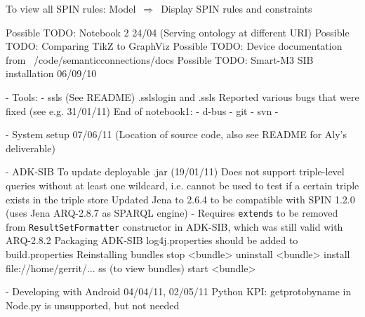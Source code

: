 To view all SPIN rules:
Model~$\Rightarrow$~Display SPIN rules and constraints



Possible TODO: Notebook 2 24/04 (Serving ontology at different URI)
Possible TODO: Comparing TikZ to GraphViz
Possible TODO: Device documentation from ~/code/semanticconnections/docs
Possible TODO: Smart-M3 SIB installation 06/09/10



- Tools: 
	- ssls (See README)
		.sslslogin and .ssls
		Reported various bugs that were fixed (see e.g. 31/01/11)
	End of notebook1:
	- d-bus
	- git
	- svn
	-

- System setup
	07/06/11 (Location of source code, also see README for Aly's deliverable)

- ADK-SIB
	To update deployable .jar (19/01/11)
	Does not support triple-level queries without at least one wildcard, i.e. cannot be used to test if a certain triple exists in the triple store
	Updated Jena to 2.6.4 to be compatible with SPIN 1.2.0 (uses Jena ARQ-2.8.7 as SPARQL engine)
		- Requires \texttt{extends} to be removed from \texttt{ResultSetFormatter} constructor in ADK-SIB, which was still valid with ARQ-2.8.2
	Packaging ADK-SIB
		log4j.properties should be added to build.properties
		Reinstalling bundles
			stop <bundle>
			uninstall <bundle>
			install file://home/gerrit/...
			ss (to view bundles)
			start <bundle>
				
- Developing with Android
	04/04/11, 02/05/11
	Python KPI: getprotobyname in Node.py is unsupported, but not needed